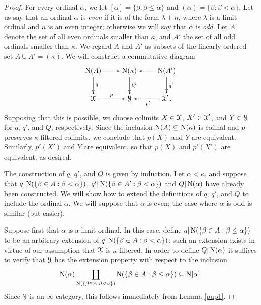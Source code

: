 \begin{proof}
For every ordinal $\alpha$, we let $[\alpha] = \{ \beta : \beta \leq \alpha \}$ and
$(\alpha) = \{ \beta: \beta < \alpha \}$. 
Let us say that an ordinal $\alpha$ is {\em even} if it is of the form $\lambda + n$, where
$\lambda$ is a limit ordinal and $n$ is an even integer; otherwise we will say that $\alpha$ is {\it odd}. Let $A$ denote the set of all even ordinals smaller than $\kappa$, and $A'$ the set of all odd ordinals smaller than $\kappa$. We regard $A$ and $A'$ as subsets of the linearly ordered set $A \cup A' = (\kappa)$. We will construct a commutative diagram
$$ \xymatrix{ \Nerve(A) \ar[r] \ar[d]^{q} & \Nerve (\kappa) \ar[d]^{Q} & \Nerve(A') \ar[d]^{q'} \ar[l] \\
\calX \ar[r]^{p} & \calY & \calX' \ar[l]^{p'}. }$$
Supposing that this is possible, we choose colimits $X \in \operatorname{\mathcal{X}}$, $X' \in \operatorname{\mathcal{X}}'$, and $Y \in \operatorname{\mathcal{Y}}$ for $q$, $q'$, and $Q$, respectively. Since the inclusion $\operatorname{N}(A) \subseteq \operatorname{N} (\kappa)$ is cofinal and $p$-preserves $\kappa$-filtered colimits, we conclude that $p(X)$ and $Y$ are equivalent.
Similarly, $p'(X')$ and $Y$ are equivalent, so that $p(X)$ and $p'(X')$ are equivalent, as desired.

The construction of $q$, $q'$, and $Q$ is given by induction. Let $\alpha < \kappa$, and suppose
that $q| \operatorname{N}(\{ \beta \in A: \beta < \alpha \})$, $q' | \operatorname{N}(\{ \beta \in A': \beta < \alpha \})$
and $Q| \operatorname{N} (\alpha)$ have already been constructed. We will show how to extend the definitions of $q$, $q'$, and $Q$ to include the ordinal $\alpha$. We will suppose that $\alpha$ is even; the case where $\alpha$ is odd is similar (but easier). 

Suppose first that $\alpha$ is a limit ordinal. In this case, define
$q | \operatorname{N}(\{ \beta \in A: \beta \leq \alpha \})$ to be an arbitrary extension of
$q | \operatorname{N}(\{ \beta \in A: \beta < \alpha \})$: such an extension exists in virtue of our assumption that $\operatorname{\mathcal{X}}$ is $\kappa$-filtered. In order to define $Q | \operatorname{N} (\alpha)$
it suffices to verify that $\operatorname{\mathcal{Y}}$ has the extension property with respect to the inclusion
$$ \operatorname{N} (\alpha) \coprod_{ \operatorname{N} (\{ \beta \in A: \beta < \alpha \}) }
\operatorname{N} (\{ \beta \in A: \beta \leq \alpha \}) \subseteq \operatorname{N}[\alpha]. $$
Since $\operatorname{\mathcal{Y}}$ is an $\infty$-category, this follows immediately from Lemma \ref{pup1}.


\end{proof}
